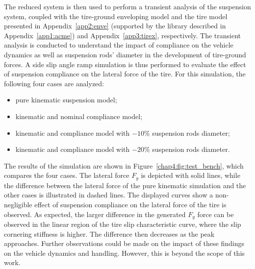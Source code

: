 The reduced system is then used to perform a transient analysis of the suspension system, coupled with the tire-ground enveloping model and the tire model presented in Appendix~\ref{app2:enve} (supported by the \Acme{} \cpp{} library described in Appendix~\ref{app1:acme}) and Appendix~\ref{app3:tirex}, respectively. The transient analysis is conducted to understand the impact of compliance on the vehicle dynamics as well as suspension rods' diameter in the development of tire-ground forces. A side slip angle ramp simulation is thus performed to evaluate the effect of suspension compliance on the lateral force of the tire. For this simulation, the following four cases are analyzed:
%
\begin{itemize}
  \setlength\itemsep{0.0em}
  \item pure kinematic suspension model;
  \item kinematic and nominal compliance model;
  \item kinematic and compliance model with $-10\%$ suspension rods diameter;
  \item kinematic and compliance model with $-20\%$ suspension rods diameter.
\end{itemize}
%
The results of the simulation are shown in Figure~\ref{chap4:fig:test_bench}, which compares the four cases. The lateral force $F_y$ is depicted with solid lines, while the difference between the lateral force of the pure kinematic simulation and the other cases is illustrated in dashed lines. The displayed curves show a non-negligible effect of suspension compliance on the lateral force of the tire is observed. As expected, the larger difference in the generated $F_y$ force can be observed in the linear region of the tire slip characteristic curve, where the slip cornering stiffness is higher. The difference then decreases as the peak approaches. Further observations could be made on the impact of these findings on the vehicle dynamics and handling. However, this is beyond the scope of this work.

